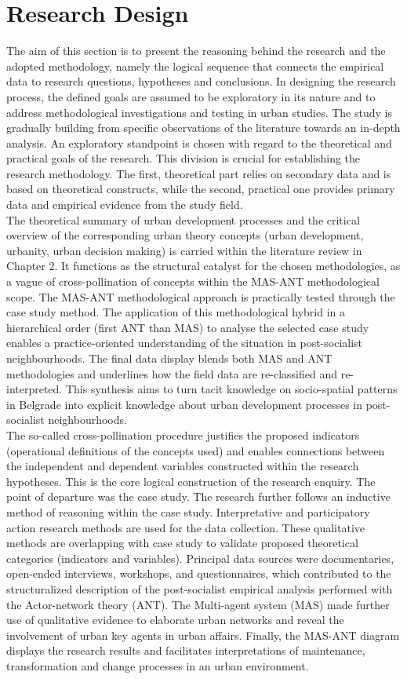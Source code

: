 \documentclass[11pt]{report}
\begin{document}
\section{Research Design}

The aim of this section is to present the reasoning behind the research and the adopted methodology, namely the logical sequence that connects the empirical data to research questions, hypotheses and conclusions. In designing the research process, the defined goals are assumed to be exploratory in its nature and to address methodological investigations and testing in urban studies. The study is gradually building from specific observations of the literature towards an in-depth analysis. An exploratory standpoint is chosen with regard to the theoretical and practical goals of the research. This division is crucial for establishing the research methodology. The first, theoretical part relies on secondary data and is based on theoretical constructs, while the second, practical one provides primary data and empirical evidence from the study field.
\\
The theoretical summary of urban development processes and the critical overview of the corresponding urban theory concepts (urban development, urbanity, urban decision making) is carried within the literature review in Chapter 2. It functions as the structural catalyst for the chosen methodologies, as a vague of cross-pollination of concepts within the MAS-ANT methodological scope.
The MAS-ANT methodological approach is practically tested through the case study method. The application of this methodological hybrid in a hierarchical order (first ANT than MAS) to analyse the selected case study enables a practice-oriented understanding of the situation in post-socialist neighbourhoods. The final data display blends both MAS and ANT methodologies and underlines how the field data are re-classified and re-interpreted. This synthesis aims to turn tacit knowledge on socio-spatial patterns in Belgrade into explicit knowledge about urban development processes in post-socialist neighbourhoods.
\\
The so-called cross-pollination procedure justifies the proposed indicators (operational definitions of the concepts used) and enables connections between the independent and dependent variables constructed within the research hypotheses. This is the core logical construction of the research enquiry.
The point of departure was the case study. The research further follows an inductive method of reasoning within the case study. Interpretative and participatory action research methods are used for the data collection. These qualitative methods are overlapping with case study to validate proposed theoretical categories (indicators and variables). Principal data sources were documentaries, open-ended interviews, workshops, and questionnaires, which contributed to the structuralized description of the post-socialist empirical analysis performed with the Actor-network theory (ANT). The Multi-agent system (MAS) made further use of qualitative evidence to elaborate urban networks and reveal the involvement of urban key agents in urban affairs. Finally, the MAS-ANT diagram displays the research results and facilitates interpretations of maintenance, transformation and change processes in an urban environment.
\end{document}
